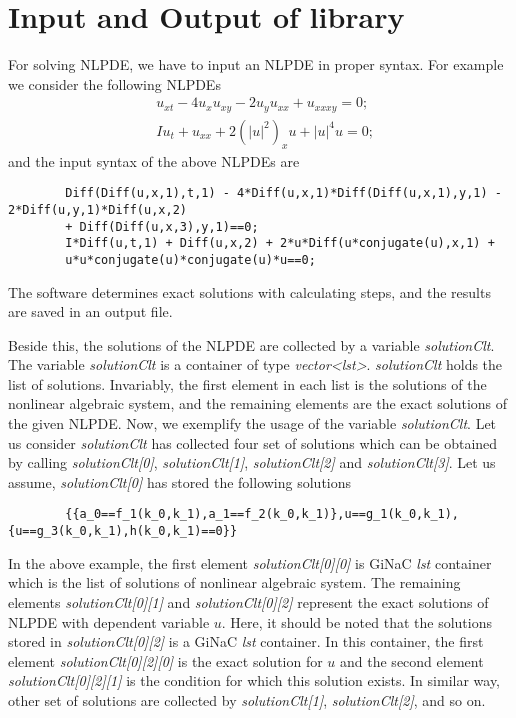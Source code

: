 \documentclass[prd,aps,floats,showkeys,nofootinbib,notitlepage]{revtex4-2}
\begin{document}
\section{Input and Output of library}
 For solving NLPDE, we have to input an NLPDE in proper syntax. For example we consider the following NLPDEs
	\begin{align}
		&{u_{xt}} - 4{u_x}{u_{xy}} - 2{u_y}{u_{xx}} + {u_{xxxy}} = 0;\\
		&I{u_t} + {u_{xx}} + 2{\left( {{{\left| u \right|}^2}} \right)_x}u + {\left| u \right|^4}u = 0;
	\end{align}
	and the input syntax of the above NLPDEs are
	\begin{verbatim}
		Diff(Diff(u,x,1),t,1) - 4*Diff(u,x,1)*Diff(Diff(u,x,1),y,1) - 2*Diff(u,y,1)*Diff(u,x,2)
		+ Diff(Diff(u,x,3),y,1)==0;
		I*Diff(u,t,1) + Diff(u,x,2) + 2*u*Diff(u*conjugate(u),x,1) + 
		u*u*conjugate(u)*conjugate(u)*u==0;
	\end{verbatim}   
	
	\par The software determines exact solutions with calculating steps, and the results are saved in an output file.
	
	Beside this, the solutions of the NLPDE are collected by a variable {\em solutionClt}. The variable {\em solutionClt} is a container of type {\em vector<lst>}.
	{\em solutionClt} holds the list of solutions. Invariably, the first element in each list is the solutions of the nonlinear algebraic system, and the remaining elements are the exact solutions of the given NLPDE.
	Now, we exemplify the usage of the variable {\em solutionClt}. Let us consider {\em solutionClt} has collected four set of solutions which can be obtained by calling {\em solutionClt[0]}, {\em solutionClt[1]}, {\em solutionClt[2]} and {\em solutionClt[3]}. Let us assume, {\em solutionClt[0]} has stored the following solutions
	\begin{verbatim}
		{{a_0==f_1(k_0,k_1),a_1==f_2(k_0,k_1)},u==g_1(k_0,k_1),{u==g_3(k_0,k_1),h(k_0,k_1)==0}}
	\end{verbatim}
	In the above example, the first element {\em solutionClt[0][0]} is GiNaC {\em lst} container which is the list of solutions of nonlinear algebraic system. The remaining elements {\em solutionClt[0][1]} and {\em solutionClt[0][2]} represent the exact solutions of NLPDE with dependent variable $u$. Here, it should be noted that the solutions stored in {\em solutionClt[0][2]} is a GiNaC {\em lst} container. In this container, the first element {\em solutionClt[0][2][0]} is the exact solution for $u$ and the second element {\em solutionClt[0][2][1]} is the condition for which this solution exists.
	In similar way, other set of solutions are collected by {\em solutionClt[1]}, {\em solutionClt[2]}, and so on.
	
\end{document}
